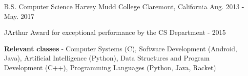 \vspace{-0.8em}


\begin{cventries}

  \cventry
    {B.S. Computer Science} %
    {Harvey Mudd College} %
    {Claremont, California} %
    {Aug. 2013 - May. 2017} %
    {
      \begin{cvitems} %
        \item {
          JArthur Award for exceptional performance by the CS Department - 2015
        }
        \item {
          \textbf{Relevant classes} - 
          Computer Systems (C), Software Development (Android, Java), Artificial
          Intelligence (Python), Data Structures and Program Development (C++),
          Programming Languages (Python, Java, Racket)
        }
      \end{cvitems}
    }

\end{cventries}
